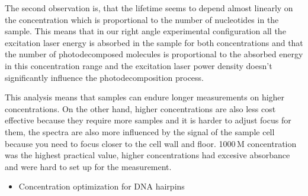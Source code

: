 The second observation is, that the lifetime seems to depend almost linearly on
the concentration which is proportional to the number of nucleotides in the
sample. This means that in our right angle experimental configuration all the
excitation laser energy is absorbed in the sample for both concentrations and
that the number of photodecomposed molecules is proportional to the absorbed
energy in this concentration range and the excitation laser power density
doesn't significantly influence the photodecomposition process.

This analysis means that samples can endure longer measurements on higher
concentrations. On the other hand, higher concentrations are also less cost
effective because they require more samples and it is harder to adjust focus
for them, the spectra are also more influenced by the signal of the sample cell
because you need to focus closer to the cell wall and floor. 1000\,M
concentration was the highest practical value, higher concentrations had
excesive absorbance and were hard to set up for the measurement.

\begin{itemize}
	\item Concentration optimization for DNA hairpins
\end{itemize}
